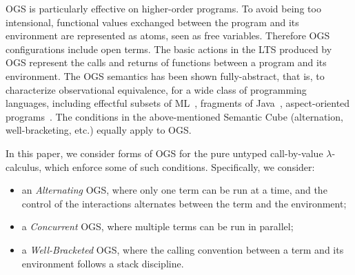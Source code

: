 \documentclass[11pt,a4paper]{amsart}
\theoremstyle{plain}
\theoremstyle{definition}
\theoremstyle{defC}
\theoremstyle{thmC}
\theoremstyle{plain}
\numberwithin{equation}{section}
\newcommand{\dsOLD}[1]{} %
\newcommand{\dsOLD}[1]{}
\theoremstyle{plain}
\theoremstyle{definition}
\begin{document}
OGS is particularly effective on higher-order programs.
To avoid being too intensional, functional values exchanged between the program and its environment 
are represented as atoms, seen as free variables.  
Therefore OGS configurations include open terms. 
The basic actions in the LTS produced by OGS represent
the calls and returns of functions between
a program
and its environment.
The OGS semantics
has been shown  fully-abstract, that is, to characterize observational equivalence,
for a wide class of
programming languages, including effectful subsets of 
ML~\cite{laird2007,10.1145/2933575.2934509},
fragments of Java~\cite{jeffrey2005java}, aspect-oriented 
programs~\cite{jagadeesan2009open}. 
The conditions  in the above-mentioned Semantic Cube (alternation,
well-bracketing, etc.)
 equally apply to OGS.

In this paper, we consider forms of OGS
for the  pure untyped call-by-value  $\lambda$-calculus,
which enforce some of such conditions.
Specifically, we consider:
\begin{itemize}
 \item an \emph{Alternating} OGS, where only one term can be run at a time, and 
the control of the interactions alternates between the  term and the environment;
 \item a \emph{Concurrent} OGS, where multiple terms can be run in parallel;
\item a \emph{Well-Bracketed} OGS, where the calling convention between a term and its
environment follows a stack discipline.
\dsOLD{mention also complete traces?}
\end{itemize}
\end{document}
